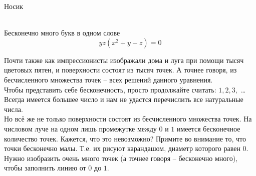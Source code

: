 \documentclass[ru]{./../../common/SurferDesc}%
\begin{document}
\footnotesize


\begin{surferPage}
  \begin{surferTitle}Носик\end{surferTitle}   \\
Бесконечно много букв в одном слове\\
\smallskip
\[y z (x^2	+ y - z)	= 0\]

\vspace{0.3cm}
Почти также как импрессионисты изображали дома и луга при помощи тысяч цветовых пятен, и поверхности состоят из тысяч точек. А точнее говоря, из бесчисленного множества точек – всех решений данного уравнения. \\
\vspace{0.3cm}
Чтобы представить себе бесконечность, просто продолжайте считать: $1, 2, 3,$ \dots\\
Всегда имеется большее число и нам не удастся перечислить все натуральные числа.\\
\vspace{0.3cm}
Но всё же не только поверхности состоят из бесчисленного множества точек. На числовом луче на одном лишь промежутке между $0$ и $1$ имеется бесконечное количество точек. Кажется, что это невозможно? Примите во внимание то, что точки бесконечно малы. Т.е. их рисуют карандашом, диаметр которого равен $0$. Нужно изобразить очень много точек (а точнее говоря – бесконечно много), чтобы заполнить линию от $0$ до $1$.

  \begin{surferText}
     \end{surferText}
\end{surferPage}
\end{document}
